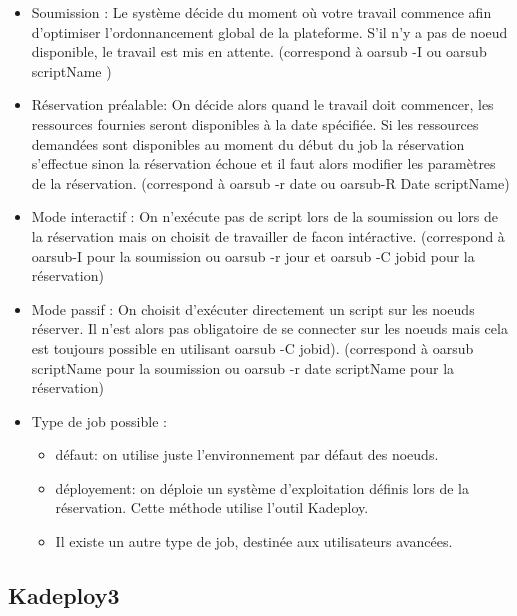 \documentclass[a4paper, 10pt, onecolumn]{report}
\begin{document}
			\begin{itemize}
				\item Soumission : Le système décide du moment où votre travail commence afin d'optimiser l'ordonnancement global de la plateforme. S'il n'y a pas de noeud disponible, le travail est mis en attente. (correspond à oarsub -I ou oarsub scriptName )\\

				\item Réservation préalable: On décide alors quand le travail doit commencer, les ressources fournies seront disponibles à la date spécifiée. Si les ressources demandées sont disponibles au moment du début du job la réservation  s'effectue sinon la réservation échoue et il faut alors modifier les paramètres de la réservation. (correspond à oarsub -r date ou oarsub-R Date  scriptName)\\

				\item Mode interactif : On n'exécute pas de script lors de la soumission ou lors de la réservation mais on choisit de travailler de facon intéractive. (correspond à oarsub-I pour la soumission ou oarsub -r jour et oarsub -C jobid pour la réservation)\\

				\item Mode passif : On choisit d'exécuter directement un script sur les noeuds réserver. Il n'est alors pas obligatoire de se connecter sur les noeuds mais cela est toujours possible en utilisant oarsub -C jobid). (correspond à oarsub scriptName pour la soumission ou oarsub -r date scriptName pour la réservation)\\
				\item Type de job possible :  \\ \begin{itemize}
     											\item défaut: on utilise juste l'environnement par défaut des noeuds.
     											\item déployement: on déploie un système d'exploitation définis lors de la réservation. Cette méthode utilise l'outil Kadeploy.
     											\item Il existe un autre type de job, destinée aux utilisateurs avancées.
     										\end{itemize}
     		\end{itemize}
      			
		\subsection{Kadeploy3}
		
\end{document}
